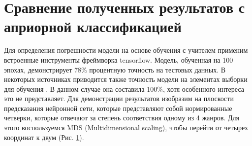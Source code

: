 \section{Сравнение полученных результатов с априорной классификацией}

Для определения погрешности модели на основе обучения с учителем применим встроенные инструменты фреймворка tensorflow.
Модель, обученная на 100 эпохах, демонстрирует 78\% процентную точность на тестовых данных. В некоторых источниках приводится также точность модели на элементах выборки для обучения \cite{bguir_mus}. В данном случае она составила 100\%, хотя особенного интереса это не представляет.
Для демонстрации результатов изобразим на плоскости предсказания нейронной сети, которые представляют собой нормированные четверки, которые отвечают за степень соответствия одному из 4 жанров. Для этого
воспользуемся MDS (Multidimensional scaling), чтобы перейти от четырех координат к двум (Рис. \ref{fig:plot}).

\begin{figure}[H]
	\caption{}
\label{fig:plot}
\end{figure}

